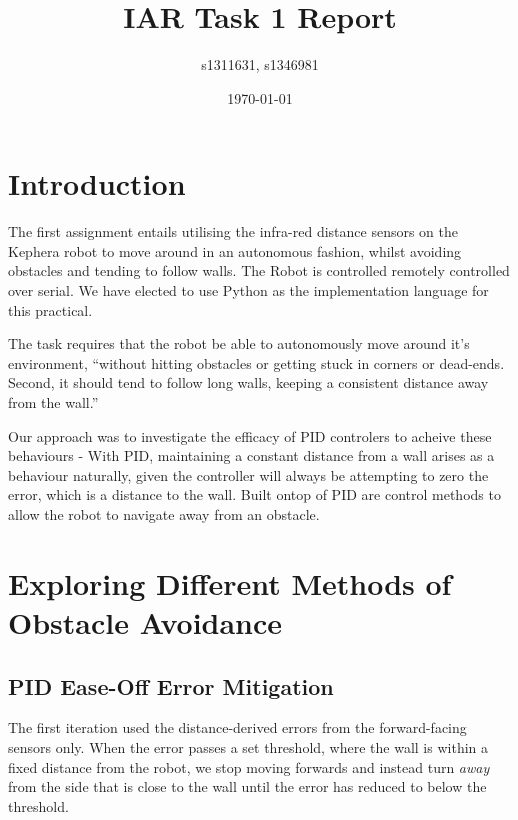 \documentclass[11pt, a4paper]{article}
\begin{document}
\title{IAR Task 1 Report}
\author{s1311631, s1346981}
\date{\today}
\maketitle


\section{Introduction}

The first assignment entails utilising the infra-red distance sensors on the Kephera 
robot to move around in an autonomous fashion, whilst avoiding obstacles and tending 
to follow walls. The Robot is controlled remotely controlled over serial. We have 
elected to use Python as the implementation language for this practical.

The task requires that the robot be able to autonomously move around it's environment,
``without hitting obstacles or getting stuck in corners or dead-ends. Second, it should 
tend to follow long walls, keeping a consistent distance away from the wall.''

Our approach was to investigate the efficacy of PID controlers to acheive 
these behaviours - With PID, maintaining a constant distance from a wall arises as
a behaviour naturally, given the controller will always be attempting to zero the 
error, which is a distance to the wall. Built ontop of PID are control methods to
allow the robot to navigate away from an obstacle.


\section{Exploring Different Methods of Obstacle Avoidance}

\subsection{PID Ease-Off Error Mitigation}


The first iteration used the distance-derived errors from the forward-facing 
sensors only. When the error passes a set threshold, where the wall is within a 
fixed distance from the robot, we stop moving forwards and instead turn \emph{away} 
from the side that is close to the wall until the error has reduced to below the 
threshold.
\end{document}
